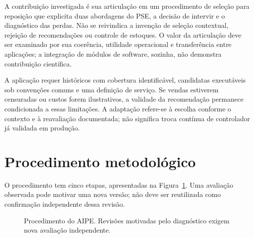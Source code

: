 A contribuição investigada é sua articulação em um procedimento de seleção para reposição que explicita duas abordagens do PSE, a decisão de intervir e o diagnóstico das perdas. Não se reivindica a invenção de seleção contextual, rejeição de recomendações ou controle de estoques. O valor da articulação deve ser examinado por sua coerência, utilidade operacional e transferência entre aplicações; a integração de módulos de software, sozinha, não demonstra contribuição científica.

A aplicação requer históricos com cobertura identificável, candidatas executáveis sob convenções comuns e uma definição de serviço. Se vendas estiverem censuradas ou custos forem ilustrativos, a validade da recomendação permanece condicionada a essas limitações. A adaptação refere-se à escolha conforme o contexto e à reavaliação documentada; não significa troca contínua de controlador já validada em produção.

\section{Procedimento metodológico}
\label{sec:procedimento_aipe}
O procedimento tem cinco etapas, apresentadas na Figura~\ref{fig:aipe_procedimento}. Uma avaliação observada pode motivar uma nova versão; não deve ser reutilizada como confirmação independente dessa revisão.

\begin{figure}[htbp]\centering
{}
\caption{Procedimento do AIPE. Revisões motivadas pelo diagnóstico exigem nova avaliação independente.}\label{fig:aipe_procedimento}
\end{figure}

